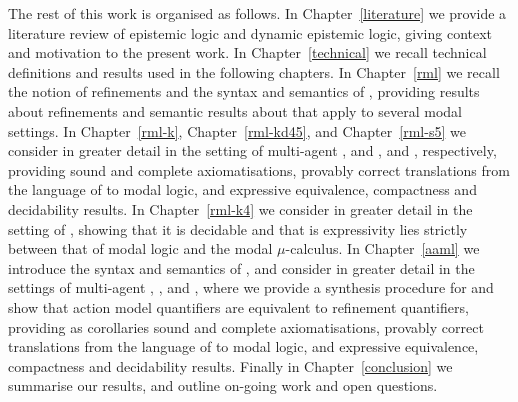 The rest of this work is organised as follows.
In Chapter~\ref{literature} we provide a literature review of epistemic logic and dynamic epistemic logic, giving context and motivation to the present work.
In Chapter~\ref{technical} we recall technical definitions and results used in the following chapters.
In Chapter~\ref{rml} we recall the notion of refinements and the syntax and semantics of \logicRml{}, providing results about refinements and semantic results about \logicRml{} that apply to several modal settings.
In Chapter~\ref{rml-k}, Chapter~\ref{rml-kd45}, and Chapter~\ref{rml-s5} we consider in greater detail \logicRml{} in the setting of multi-agent \classK{}, \classKFF{} and \classKD{}, and \classS{}, respectively, providing sound and complete axiomatisations, provably correct translations from the language of \logicRml{} to modal logic, and expressive equivalence, compactness and decidability results.
In Chapter~\ref{rml-k4} we consider in greater detail \logicRml{} in the setting of \classKF{}, showing that it is decidable and that is expressivity lies strictly between that of modal logic and the modal $\mu$-calculus.
In Chapter~\ref{aaml} we introduce the syntax and semantics of \logicAaml{}, and consider in greater detail \logicAaml{} in the settings of multi-agent \classK{}, \classKFF{}, and \classS{}, where we provide a synthesis procedure for \logicAaml{} and show that action model quantifiers are equivalent to refinement quantifiers, providing as corollaries sound and complete axiomatisations, provably correct translations from the language of \logicAaml{} to modal logic, and expressive equivalence, compactness and decidability results.
Finally in Chapter~\ref{conclusion} we summarise our results, and outline on-going work and open questions.
